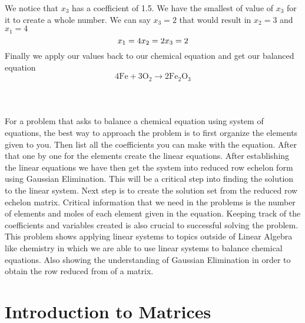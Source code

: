 \documentclass[12pt]{article}
\begin{document}
 We notice that $x_3$ has a coefficient of 1.5. We have the smallest of value of $x_3$ for it to create a whole number. We can say $x_3=2$ that would result in $x_2=3$ and $x_1=4$
  \begin{equation*}
 x_1 = 4 \\
 x_2 = 2 \\
 x_3 = 2
 \end{equation*}
 Finally we apply our values back to our chemical equation and get our balanced equation
 \begin{equation*}
4\text{Fe}+3\text{O}_2 \rightarrow 2\text{Fe}_2\text{O}_3
\end{equation*}\\
\\\\
For a problem that asks to balance a chemical equation using system of equations, the best way to approach the problem is to first organize the elements given to you. Then list all the coefficients you can make with the equation. After that one by one for the elements create the linear equations. After establishing the linear equations we have then get the system into reduced row echelon form using Gaussian Elimination. This will be a critical step into finding the solution to the linear system. Next step is to create the solution set from the reduced row echelon matrix. Critical information that we need in the problems is the number of elements and moles of each element given in the equation. Keeping track of the coefficients and variables created is also crucial to successful solving the problem. This problem shows applying linear systems to topics outside of Linear Algebra like chemistry in which we are able to use linear systems to balance chemical equations. Also showing the understanding of Gaussian Elimination in order to obtain the row reduced from of a matrix.
\newpage
\section{Introduction to Matrices}
\end{document}
